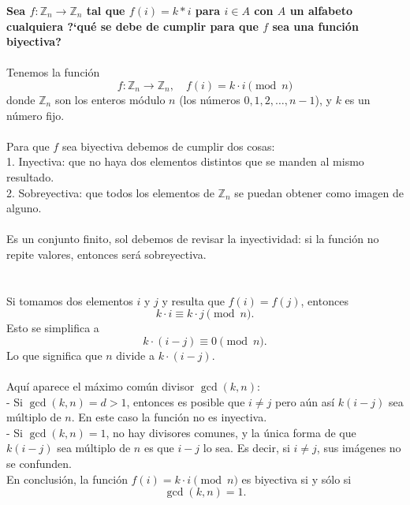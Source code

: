 \textbf{Sea $f: \mathbb{Z}_n \rightarrow \mathbb{Z}_n$ tal que $f(i)=k * i$ para $i \in A$ con $A$ un alfabeto cualquiera ?`qu\'e se debe de cumplir para que $f$ sea una funci\'on biyectiva?}\\\\
Tenemos la función  
\[
f:\mathbb{Z}_n \to \mathbb{Z}_n, \quad f(i)=k \cdot i \pmod n
\]
donde \(\mathbb{Z}_n\) son los enteros módulo \(n\) (los números \(0,1,2,\dots,n-1\)), y \(k\) es un número fijo.  
\\\\
Para que \(f\) sea biyectiva debemos de cumplir dos cosas:\\  
1. Inyectiva: que no haya dos elementos distintos que se manden al mismo resultado.\\  
2. Sobreyectiva: que todos los elementos de \(\mathbb{Z}_n\) se puedan obtener como imagen de alguno.  
\\\\
Es un conjunto finito, sol debemos de revisar la inyectividad: si la función no repite valores, entonces será sobreyectiva.  
\\\\\\  
Si tomamos dos elementos \(i\) y \(j\) y resulta que \(f(i) = f(j)\), entonces
\[
k \cdot i \equiv k \cdot j \pmod{n}.
\]
Esto se simplifica a  
\[
k \cdot (i-j) \equiv 0 \pmod{n}.
\]
Lo que significa que \(n\) divide a \(k \cdot (i-j)\).  
\\\\
Aquí aparece el máximo común divisor \(\gcd(k,n)\):\\  
- Si \(\gcd(k,n) = d > 1\), entonces es posible que \(i \neq j\) pero aún así \(k(i-j)\) sea múltiplo de \(n\). En este caso la función no es inyectiva.  \\
- Si \(\gcd(k,n)=1\), no hay divisores comunes, y la única forma de que \(k(i-j)\) sea múltiplo de \(n\) es que \(i-j\) lo sea. Es decir, si \(i\neq j\), sus imágenes no se confunden.  \\
En conclusión, la función $f(i) = k \cdot i \pmod{n}$ es biyectiva si y sólo si
\[
\gcd(k,n) = 1.
\]
\citep{lec_7_handout}
